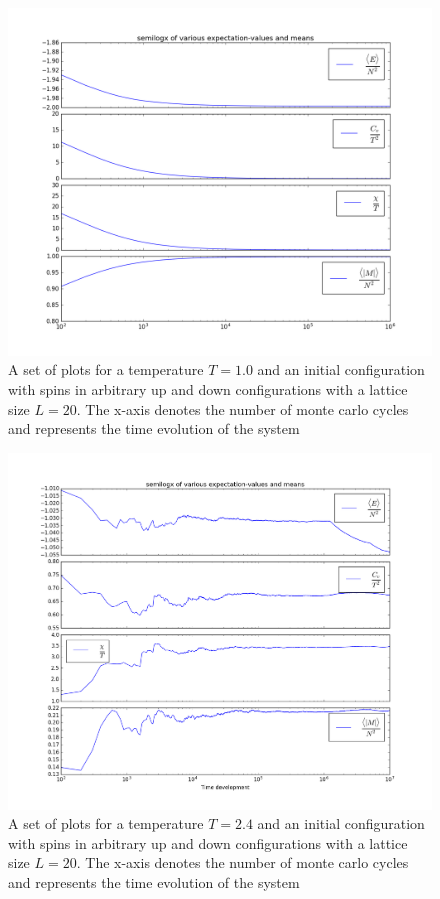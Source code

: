 \documentclass[12pt]{article}
\begin{document}
\begin{figure}
\hspace*{-2cm}\includegraphics[scale=0.5]{exp_vals.png}
\caption{A set of plots for a temperature $T = 1.0$ and an initial configuration with spins in arbitrary up and down configurations with a lattice size $L = 20$. The x-axis denotes the number of monte carlo cycles and represents the time evolution of the system}\label{fig:exp_t1}
\end{figure}

\begin{figure}
\hspace*{-4cm}\includegraphics[scale=0.5]{exp_vals_2.png}
\caption{A set of plots for a temperature $T = 2.4$ and an initial configuration with spins in arbitrary up and down configurations with a lattice size $L = 20$. The x-axis denotes the number of monte carlo cycles and represents the time evolution of the system}\label{fig:exp_t2}
\end{figure}
\end{document}

